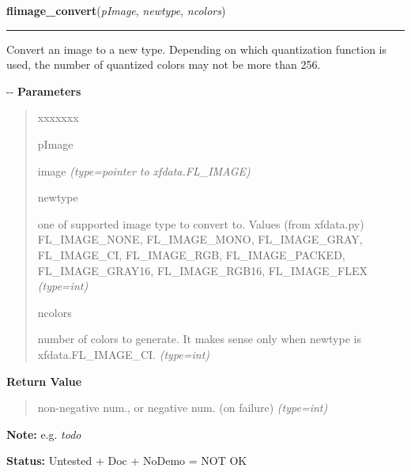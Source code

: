 \hspace{.8\funcindent}\begin{boxedminipage}{\funcwidth}

    \raggedright \textbf{flimage\_convert}(\textit{pImage}, \textit{newtype}, \textit{ncolors})

    \vspace{-1.5ex}

    \rule{\textwidth}{0.5\fboxrule}
\setlength{\parskip}{2ex}

Convert an image to a new type. Depending on which quantization
function is used, the number of quantized colors may not be more than 256.

-{}-
\setlength{\parskip}{1ex}
      \textbf{Parameters}
      \vspace{-1ex}

      \begin{quote}
        \begin{Ventry}{xxxxxxx}

          \item[pImage]


image
            {\it (type=pointer to xfdata.FL\_IMAGE)}

          \item[newtype]


one of supported image type to convert to. Values (from xfdata.py)
FL\_IMAGE\_NONE, FL\_IMAGE\_MONO, FL\_IMAGE\_GRAY, FL\_IMAGE\_CI, FL\_IMAGE\_RGB,
FL\_IMAGE\_PACKED, FL\_IMAGE\_GRAY16, FL\_IMAGE\_RGB16, FL\_IMAGE\_FLEX
            {\it (type=int)}

          \item[ncolors]


number of colors to generate. It makes sense only when newtype is
xfdata.FL\_IMAGE\_CI.
            {\it (type=int)}

        \end{Ventry}

      \end{quote}

      \textbf{Return Value}
    \vspace{-1ex}

      \begin{quote}

non-negative num., or negative num. (on failure)
      {\it (type=int)}

      \end{quote}

\textbf{Note:} 
e.g. \emph{todo}


\textbf{Status:} 
Untested + Doc + NoDemo = NOT OK


    \end{boxedminipage}

